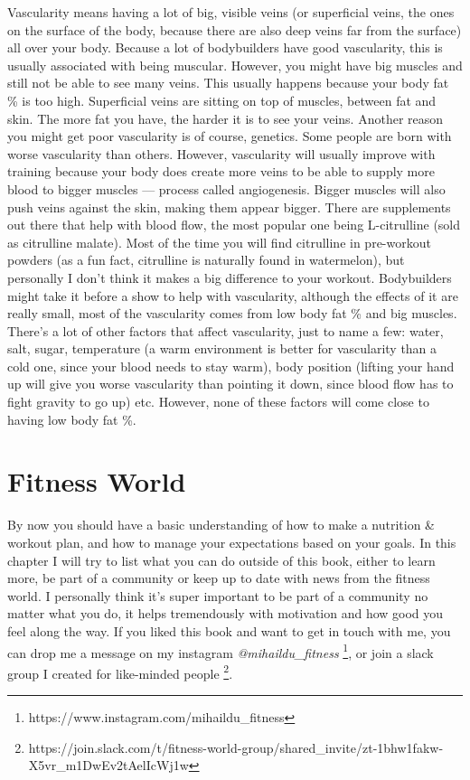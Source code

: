 \documentclass[openany, 12pt]{book}
\begin{document}
        Vascularity means having a lot of big, visible veins (or superficial veins, the ones on the surface of the body, because there are also deep veins far from the surface) all over your body.
        Because a lot of bodybuilders have good vascularity, this is usually associated with being muscular. However, you might have big muscles and still not be able to see many veins. This usually
        happens because your body fat \% is too high. Superficial veins are sitting on top of muscles, between fat and skin. The more fat you have, the harder it is to see your veins.
        Another reason you might get poor vascularity is of course, genetics. Some people are born with worse vascularity than others. However, vascularity will usually improve with training
        because your body does create more veins to be able to supply more blood to bigger muscles --- process called angiogenesis.
        Bigger muscles will also push veins against the skin, making them appear bigger.
        There are supplements out there that help with blood flow, the most popular one being L-citrulline (sold as citrulline malate). Most of the time you will find citrulline in pre-workout
        powders (as a fun fact, citrulline is naturally found in watermelon), but personally I don't think it makes a big difference to your workout. Bodybuilders might take it before a show
        to help with vascularity, although the effects of it are really small, most of the vascularity comes from low body fat \% and big muscles.
        There's a lot of other factors that affect vascularity, just to name a few:
        water, salt, sugar, temperature (a warm environment is better for vascularity than a cold one, since your blood needs to stay warm), body position (lifting your hand up will give you worse
        vascularity than pointing it down, since blood flow has to fight gravity to go up) etc. However, none of these factors will come close to having low body fat \%.

  \chapter{Fitness World}

  By now you should have a basic understanding of how to make a nutrition \& workout plan, and how to manage your expectations based on your goals. In this chapter I will try to
  list what you can do outside of this book, either to learn more, be part of a community or keep up to date with news from the fitness world. I personally think it's super important
  to be part of a community no matter what you do, it helps tremendously with motivation and how good you feel along the way. If you liked this book and want to get in touch with me,
  you can drop me a message on my instagram \textit{@mihaildu\_fitness}
  \footnote{https://www.instagram.com/mihaildu\_fitness}, or join a slack group I created for like-minded people
  \footnote{https://join.slack.com/t/fitness-world-group/shared\_invite/zt-1bhw1fakw-X5vr\_m1DwEv2tAelIcWj1w}.
\end{document}
